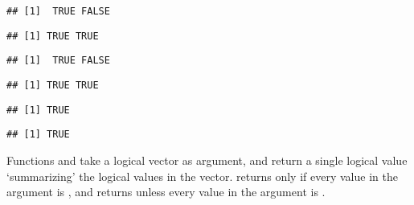 \documentclass[paper=a4,10pt,div=17,headsepline,BCOR=12mm,twoside,open=right]{scrbook}\usepackage{knitr}
\begin{document}
\begin{knitrout}\footnotesize
{}\color{fgcolor}\begin{kframe}
\begin{alltt}
 \hlkwb{<-} \hlstd{(}\hlstd{,}\hlstd{)}
 \hlkwb{<-} \hlstd{(}\hlstd{,}\hlstd{)}
\end{alltt}
\begin{verbatim}
## [1]  TRUE FALSE
\end{verbatim}
\begin{alltt}
\end{alltt}
\begin{verbatim}
## [1] TRUE TRUE
\end{verbatim}
\begin{alltt}
 \hlopt{&}  
\end{alltt}
\begin{verbatim}
## [1]  TRUE FALSE
\end{verbatim}
\begin{alltt}
 \hlopt{|}  
\end{alltt}
\begin{verbatim}
## [1] TRUE TRUE
\end{verbatim}
\begin{alltt}
 \hlopt{&&}  
\end{alltt}
\begin{verbatim}
## [1] TRUE
\end{verbatim}
\begin{alltt}
 \hlopt{||}  
\end{alltt}
\begin{verbatim}
## [1] TRUE
\end{verbatim}
\end{kframe}
\end{knitrout}

Functions  and  take a logical vector as argument, and return a single logical value `summarizing' the logical values in the vector.  returns  only if every value in the argument is , and  returns  unless every value in the argument is .
\end{document}
